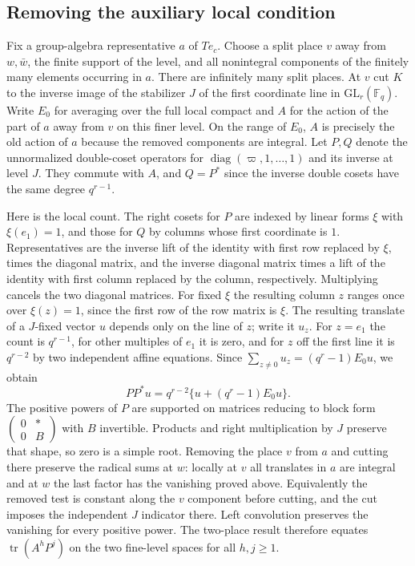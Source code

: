 \subsection{Removing the auxiliary local condition}\label{tr:line}
Fix a group-algebra representative $a$ of $T e_c$. Choose a split
place $v$ away from $w,\bar w$, the finite support of the level, and
all nonintegral components of the finitely many elements occurring in
$a$. There are infinitely many split places. At $v$ cut $K$ to the
inverse image of the stabilizer $J$ of the first coordinate line in
$\mathrm{GL}_r(\mathbb F_q)$. Write $E_0$ for averaging over the full
local compact and $A$ for the action of the part of $a$ away from $v$
on this finer level. On the range of $E_0$, $A$ is precisely the old
action of $a$ because the removed components are integral.
Let $P,Q$ denote the unnormalized double-coset operators for
$\operatorname{diag}(\varpi,1,\ldots,1)$ and its inverse at level $J$.
They commute with $A$, and $Q=P^*$ since the inverse double cosets
have the same degree $q^{r-1}$.

Here is the local count. The right cosets for $P$ are indexed by
linear forms $\xi$ with $\xi(e_1)=1$, and those for $Q$ by columns
whose first coordinate is $1$. Representatives are the inverse lift of
the identity with first row replaced by $\xi$, times the diagonal matrix,
and the inverse diagonal matrix times a lift of the identity with first
column replaced by the column, respectively. Multiplying cancels the two
diagonal matrices. For fixed $\xi$ the resulting column $z$ ranges
once over $\xi(z)=1$, since the first row of the row matrix is $\xi$.
The resulting translate of a $J$-fixed vector $u$ depends only on the
line of $z$; write it $u_z$. For $z=e_1$ the count is $q^{r-1}$,
for other multiples of $e_1$ it is zero, and for $z$ off the first
line it is $q^{r-2}$ by two independent affine equations. Since
$\sum_{z\ne0}u_z=(q^r-1)E_0u$, we obtain
\begin{equation}\label{tr:parahoric}
 PP^*u=q^{r-2}\{u+(q^r-1)E_0u\}.
\end{equation}
The positive powers of $P$ are supported on matrices reducing to block
form $\left(\begin{smallmatrix}0&*\\0&B\end{smallmatrix}\right)$ with
$B$ invertible. Products and right multiplication by $J$ preserve that
shape, so zero is a simple root. Removing the place $v$ from $a$ and
cutting there preserve the radical sums at $w$: locally at $v$ all
translates in $a$ are integral and at $w$ the last factor has the
vanishing proved above. Equivalently the removed test is constant along
the $v$ component before cutting, and the cut imposes the independent
$J$ indicator there. Left convolution preserves the vanishing for every
positive power. The two-place result therefore equates
$\operatorname{tr}(A^hP^j)$ on the two fine-level spaces for all $h,j\ge1$.

